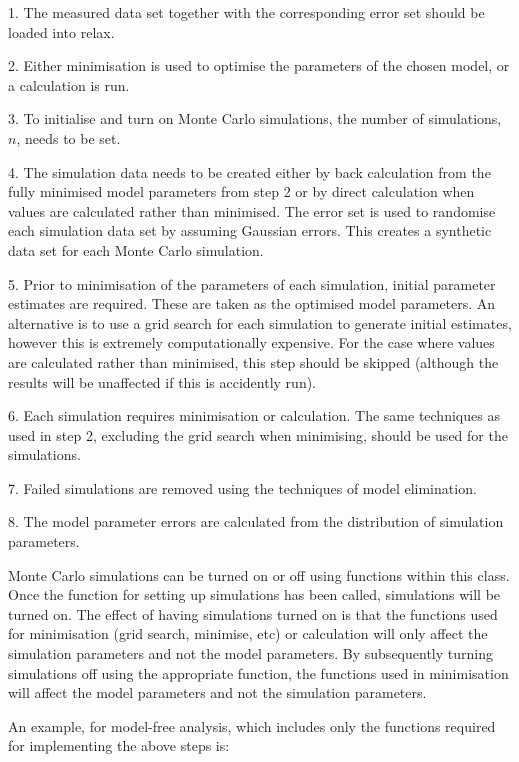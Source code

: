 1.  The measured data set together with the corresponding error set should be loaded into
relax.

2.  Either minimisation is used to optimise the parameters of the chosen model, or a
calculation is run.

3.  To initialise and turn on Monte Carlo simulations, the number of simulations, $n$, needs
to be set.

4.  The simulation data needs to be created either by back calculation from the fully
minimised model parameters from step 2 or by direct calculation when values are calculated
rather than minimised.  The error set is used to randomise each simulation data set by
assuming Gaussian errors.  This creates a synthetic data set for each Monte Carlo
simulation.

5.  Prior to minimisation of the parameters of each simulation, initial parameter estimates
are required.  These are taken as the optimised model parameters.  An alternative is to use
a grid search for each simulation to generate initial estimates, however this is extremely
computationally expensive.  For the case where values are calculated rather than minimised,
this step should be skipped (although the results will be unaffected if this is accidently
run).

6.  Each simulation requires minimisation or calculation.  The same techniques as used in
step 2, excluding the grid search when minimising, should be used for the simulations.

7.  Failed simulations are removed using the techniques of model elimination.

8.  The model parameter errors are calculated from the distribution of simulation
parameters.


Monte Carlo simulations can be turned on or off using functions within this class.  Once the
function for setting up simulations has been called, simulations will be turned on.  The
effect of having simulations turned on is that the functions used for minimisation (grid
search, minimise, etc) or calculation will only affect the simulation parameters and not the
model parameters.  By subsequently turning simulations off using the appropriate function,
the functions used in minimisation will affect the model parameters and not the simulation
parameters.


An example, for model-free analysis, which includes only the functions required for
implementing the above steps is:


